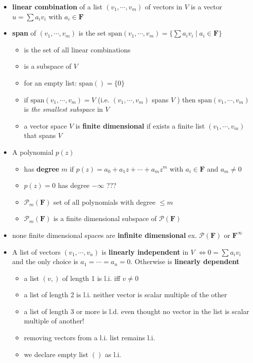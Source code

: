 \documentclass[11pt,notitlepage,oneside]{article}
\begin{document}
\begin{itemize}
\item \textbf{linear combination} of a list $(v_1, \cdots, v_m)$ of vectors in $V$ is a vector $u = \sum a_i v_i$ with $a_i\in \mathbf{F}$
\item \textbf{span} of $(v_1, \cdots, v_m)$ is the set $\mathrm{span}(v_1, \cdots, v_m) = \{ \sum a_i v_i \mid a_i\in\mathbf{F}\}$
\begin{itemize}
  \item is the set of all linear combinations
  \item is a subspace of $V$
  \item for an empty list: $\mathrm{span}() = \{0\}$
  \item if $\mathrm{span}(v_1, \cdots, v_m) = V$ (i.e. $(v_1, \cdots, v_m)$ spans $V$ ) then $\mathrm{span}(v_1, \cdots, v_m)$ is \emph{the smallest subspace} in $V$
  \item a vector space $V$ is \textbf{finite dimensional} if exists a finite list $(v_1, \cdots, v_m)$ that spans $V$
\end{itemize}
\item A polynomial $p(z)$ 
\begin{itemize}
  \item has \textbf{degree} $m$ if $p(z)=a_0+a_1z+\cdots+a_mz^m$ with $a_i\in \mathbf{F}$ and $a_m\neq 0$
  \item $p(z)=0$ has degree $-\infty$ ???
  \item $\mathcal{P}_m(\mathbf{F})$ set of all polynomials with degree $\leq m$
  \item $\mathcal{P}_m(\mathbf{F})$ is a finite dimensional subspace of $\mathcal{P}(\mathbf{F})$
\end{itemize}
\item none finite dimensional spaces are \textbf{infinite dimensional} ex. $\mathcal{P}(\mathbf{F})$ or $\mathbf{F}^\infty$
\item A list of vectors $(v_1,\cdots,v_n)$ is \textbf{linearly independent} in $V$ $\iff 0 = \sum a_i v_i$
and the only choice is $a_1=\cdots=a_n=0$. Otherwise is \textbf{linearly dependent}
\begin{itemize}
  \item a list $(v,)$ of length 1 is l.i. iff $v\neq 0$
  \item a list of length 2 is l.i. neither vector is scalar multiple of the other
  \item a list of length 3 or more is l.d. even thought no vector in the list is scalar multiple of another!
  \item removing vectors from a l.i. list remains l.i.
  \item we declare empty list $()$ as l.i.
\end{itemize}


\end{itemize}
\end{document}

